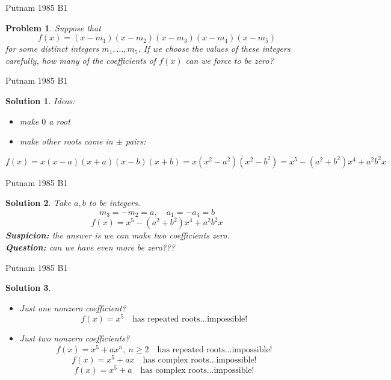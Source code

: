 \documentclass{beamer}
\newtheorem{prob}{Problem}
\newtheorem{soln}{Solution}
\begin{document}
\begin{frame}{Putnam 1985 B1}
\begin{prob}
Suppose that
$$f(x) = (x-m_1)(x-m_2)(x-m_3)(x-m_4)(x-m_5)$$
for some distinct integers $m_1,\dots, m_5$.
If we choose the values of these integers carefully, how many of the coefficients of $f(x)$ can we force to be zero?
\end{prob}
\pause
\end{frame}

\begin{frame}{Putnam 1985 B1}
\begin{soln}
Ideas:
\begin{itemize}
\item make $0$ a root
\item make other roots come in $\pm$ pairs: 
\end{itemize}
$$f(x) = x(x-a)(x+a)(x-b)(x+b) = x(x^2-a^2)(x^2-b^2) = x^5 - (a^2+b^2)x^4 + a^2b^2x$$
\end{soln}
\end{frame}

\begin{frame}{Putnam 1985 B1}
\begin{soln}
Take $a,b$ to be integers.\\
$$m_3 = -m_2 = a,\quad a_1=-a_4=b$$
$$f(x) = x^5 - (a^2+b^2)x^4 + a^2b^2x$$
\pause
\textbf{Suspicion:} the answer is we can make two coefficients zero.\\
\pause
\textbf{Question:} can we have even more be zero???
\end{soln}
\end{frame}

\begin{frame}{Putnam 1985 B1}
\begin{soln}
\begin{itemize}
\pause
\item Just one nonzero coefficient?\\
\pause
$$f(x) = x^5\quad\text{has repeated roots...impossible!}$$
\pause
\item Just two nonzero coefficients?\\
\pause
$$f(x) = x^5+ax^n,\ n\geq 2\quad\text{has repeated roots...impossible!}$$
\pause
$$f(x) = x^5 + ax\quad\text{has complex roots...impossible!}$$
\pause
$$f(x) = x^5 + a\quad\text{has complex roots...impossible!}$$
\end{itemize}
\end{soln}
\end{frame}
\end{document}
